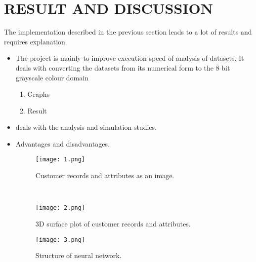 

\chapter{RESULT AND DISCUSSION}

\hspace{0.9cm} The implementation described in the previous section leads to a lot of results and requires explanation.

\begin{itemize}
	\item The project is mainly to improve execution speed of analysis of datasets. It deals with converting the datasets from its numerical form to the 8 bit grayscale colour domain\\
	\begin{enumerate}
		\item Graphs
		\item Result
	\end{enumerate}
%	
%	
	
	\item deals with the analysis and simulation studies.
	\item Advantages and disadvantages.
	\begin{figure}[h!]
		\centering	
		\texttt{[image: 1.png]} %
		\caption{Customer records and attributes as an image.}
		\label{fig:1} %
		
	\end{figure}\\
	\begin{figure}[h!]
		\centering	
		\texttt{[image: 2.png]} %
		\caption{ 3D surface plot of customer records and attributes.}
		\label{fig:2} %
		
	\end{figure}
	\begin{figure}[h!]
		\centering	
		\texttt{[image: 3.png]} %
		\caption{ Structure of neural network.}
		\label{fig:3} %
		

\end{figure}
\end{itemize}
